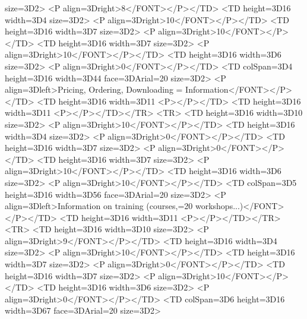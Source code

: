 size=3D2>
            <P align=3Dright>8</FONT></P></TD>
        <TD height=3D16 width=3D4%
size=3D2>
            <P align=3Dright>10</FONT></P></TD>
        <TD height=3D16 width=3D7%
size=3D2>
            <P align=3Dright>10</FONT></P></TD>
        <TD height=3D16 width=3D7%
size=3D2>
            <P align=3Dright>10</FONT></P></TD>
        <TD height=3D16 width=3D6%
size=3D2>
            <P align=3Dright>0</FONT></P></TD>
        <TD colSpan=3D4 height=3D16 width=3D44%
face=3DArial=20
            size=3D2>
            <P align=3Dleft>Pricing, Ordering, Downloading =
Information</FONT></P></TD>
        <TD height=3D16 width=3D11%
            <P></P></TD>
        <TD height=3D16 width=3D11%
            <P></P></TD></TR>
    <TR>
        <TD height=3D16 width=3D10%
size=3D2>
            <P align=3Dright>10</FONT></P></TD>
        <TD height=3D16 width=3D4%
size=3D2>
            <P align=3Dright>0</FONT></P></TD>
        <TD height=3D16 width=3D7%
size=3D2>
            <P align=3Dright>0</FONT></P></TD>
        <TD height=3D16 width=3D7%
size=3D2>
            <P align=3Dright>10</FONT></P></TD>
        <TD height=3D16 width=3D6%
size=3D2>
            <P align=3Dright>10</FONT></P></TD>
        <TD colSpan=3D5 height=3D16 width=3D56%
face=3DArial=20
            size=3D2>
            <P align=3Dleft>Information on training (courses,=20
            workshops...)</FONT></P></TD>
        <TD height=3D16 width=3D11%
            <P></P></TD></TR>
    <TR>
        <TD height=3D16 width=3D10%
size=3D2>
            <P align=3Dright>9</FONT></P></TD>
        <TD height=3D16 width=3D4%
size=3D2>
            <P align=3Dright>10</FONT></P></TD>
        <TD height=3D16 width=3D7%
size=3D2>
            <P align=3Dright>0</FONT></P></TD>
        <TD height=3D16 width=3D7%
size=3D2>
            <P align=3Dright>10</FONT></P></TD>
        <TD height=3D16 width=3D6%
size=3D2>
            <P align=3Dright>0</FONT></P></TD>
        <TD colSpan=3D6 height=3D16 width=3D67%
face=3DArial=20
            size=3D2>
